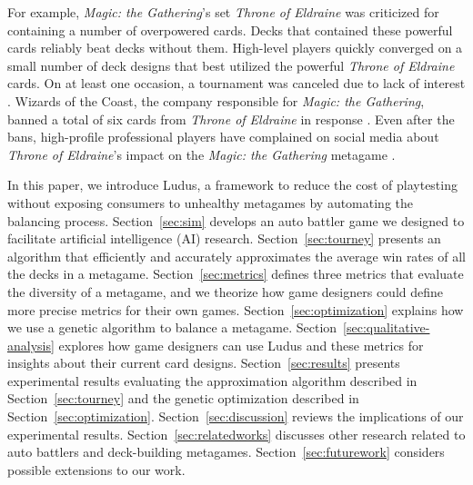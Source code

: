 \documentclass[letterpaper]{article} %
\begin{document}

For example, \textit{Magic: the Gathering}'s set \textit{Throne of
  Eldraine} was criticized for containing a number of overpowered
cards. Decks that contained these powerful cards reliably beat decks
without them. High-level players quickly converged on a small number
of deck designs that best utilized the powerful \textit{Throne
  of Eldraine} cards. On at least one occasion, a tournament was
canceled due to lack of interest \cite{oko-meta-drama}. Wizards of the
Coast, the company responsible for \textit{Magic: the Gathering},
banned a total of six cards from \textit{Throne of Eldraine} in
response \cite{mtg-banlist, mtg-bnr-nov-2019, mtg-bnr-jun-2020,
  mtg-bnr-aug-2020}. Even after the bans, high-profile professional
players have complained on social media about \textit{Throne of
  Eldraine}'s impact on the \textit{Magic: the Gathering} metagame
\cite{lsv-eldraine-complaints}.


In this paper, we introduce {\sc Ludus}, a framework to reduce the cost of playtesting without
exposing consumers to unhealthy metagames by automating the balancing
process. Section~\ref{sec:sim} %
develops an auto battler game we designed to facilitate artificial intelligence (AI) research. 
Section~\ref{sec:tourney} presents an algorithm that efficiently
and accurately approximates the average win rates of all the decks in
a metagame. Section~\ref{sec:metrics} defines three metrics that
evaluate the diversity of a metagame, and %
we theorize how game designers could define
more precise metrics for their own games. Section~\ref{sec:optimization}
explains how we use a genetic algorithm to balance a metagame.
Section~\ref{sec:qualitative-analysis} explores how game designers can use {\sc Ludus} and these
metrics for insights about their current card designs.
Section~\ref{sec:results} presents
experimental results evaluating the approximation algorithm described
in Section~\ref{sec:tourney} and the genetic optimization described in
Section~\ref{sec:optimization}. Section~\ref{sec:discussion} reviews the
implications of our experimental results. Section~\ref{sec:relatedworks}
discusses other research related to auto
battlers and deck-building metagames. Section~\ref{sec:futurework}
considers possible extensions to our work.
\end{document}
